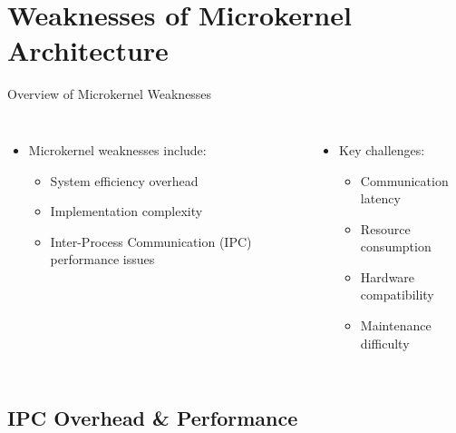 \documentclass[aspectratio=169, table]{beamer}
\begin{document}
\section{Weaknesses of Microkernel Architecture}

\begin{frame}{Overview of Microkernel Weaknesses}
\vspace{20pt}
\begin{columns}
\begin{itemize}
	\item Microkernel weaknesses include:
	\begin{itemize}
		\item System efficiency overhead
		\item Implementation complexity
		\item Inter-Process Communication (IPC) performance issues
	\end{itemize}
\end{itemize}
\begin{itemize}
	\item Key challenges:
	\begin{itemize}
		\item Communication latency
		\item Resource consumption
		\item Hardware compatibility
		\item Maintenance difficulty
	\end{itemize}
\end{itemize}
\end{columns}
\end{frame}

\subsection{IPC Overhead \& Performance}
\end{document}
